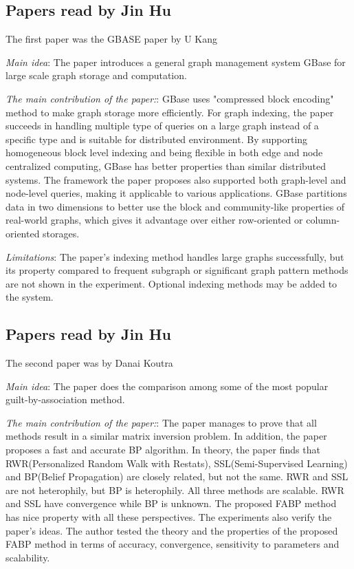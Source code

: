 \subsection{Papers read by Jin Hu}
The first paper was the GBASE paper by U Kang
\begin{itemize*}
\item {\em Main idea}: The paper introduces a general graph management system GBase for large scale graph storage and computation.
\item {\em The main contribution of the paper:}:
      GBase uses "compressed block encoding" method to make graph storage more efficiently.
    For graph indexing, the paper succeeds in handling multiple type of queries on a large graph instead of a specific type and is suitable for distributed environment. By supporting homogeneous block level indexing and being flexible in both edge and node centralized computing, GBase has better properties than similar distributed systems.
    The framework the paper proposes also supported both graph-level and node-level queries, making it applicable to various applications.
    GBase partitions data in two dimensions to better use the block and community-like properties of real-world graphs,
    which gives it advantage over either row-oriented or column-oriented storages.
\item {\em Limitations}:
      The paper's indexing method handles large graphs successfully, but its property compared to frequent subgraph
    or significant graph pattern methods are not shown in the experiment. Optional indexing methods may be added to
    the system.
\end{itemize*}

\subsection{Papers read by Jin Hu}
The second paper was by Danai Koutra
\begin{itemize*}
\item {\em Main idea}: The paper does the comparison among some of the most popular guilt-by-association method.
\item {\em The main contribution of the paper:}:
      The paper manages to prove that all methods result in a similar matrix inversion problem. In addition, the paper proposes a fast and accurate BP algorithm. In theory, the paper finds that RWR(Personalized Random Walk with Restats), SSL(Semi-Supervised Learning) and BP(Belief Propagation) are closely related, but not the same. RWR and SSL are not heterophily, but BP is heterophily. All three methods are scalable. RWR and SSL have convergence while BP is unknown. The proposed FABP method has nice property with all these perspectives. The experiments also verify the paper's ideas. The author tested the theory and the properties of the proposed FABP method in terms of accuracy, convergence, sensitivity to parameters and scalability.
\end{itemize*}

